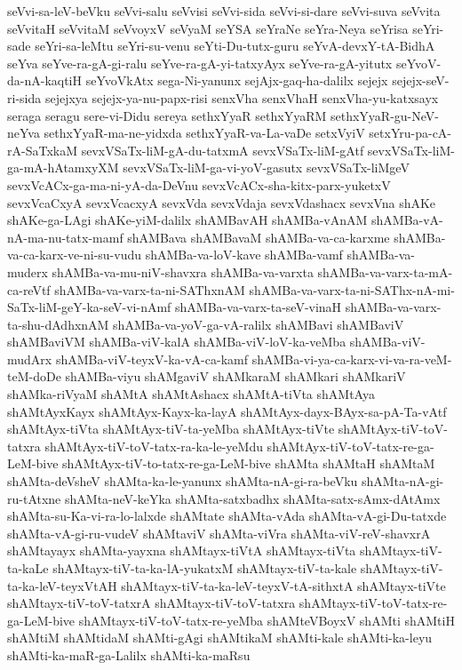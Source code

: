 {seVvi-sa-leV-beVku
seVvi-salu
seVvisi
seVvi-sida
seVvi-si-dare
seVvi-suva
seVvita
seVvitaH
seVvitaM
seVvoyxV
seVyaM
seYSA
seYraNe
seYra-Neya
seYrisa
seYri-sade
seYri-sa-leMtu
seYri-su-venu
seYti-Du-tutx-guru
seYvA-devxY-tA-BidhA
seYva
seYve-ra-gA-gi-ralu
seYve-ra-gA-yi-tatxyAyx
seYve-ra-gA-yitutx
seYvoV-da-nA-kaqtiH
seYvoVkAtx
sega-Ni-yanunx
sejAjx-gaq-ha-dalilx
sejejx
sejejx-seV-ri-sida
sejejxya
sejejx-ya-nu-papx-risi
senxVha
senxVhaH
senxVha-yu-katxsayx
seraga
seragu
sere-vi-Didu
sereya
sethxYyaR
sethxYyaRM
sethxYyaR-gu-NeV-neYva
sethxYyaR-ma-ne-yidxda
sethxYyaR-va-La-vaDe
setxVyiV
setxYru-pa-cA-rA-SaTxkaM
sevxVSaTx-liM-gA-du-tatxmA
sevxVSaTx-liM-gAtf
sevxVSaTx-liM-ga-mA-hAtamxyXM
sevxVSaTx-liM-ga-vi-yoV-gasutx
sevxVSaTx-liMgeV
sevxVcACx-ga-ma-ni-yA-da-DeVnu
sevxVcACx-sha-kitx-parx-yuketxV
sevxVcaCxyA
sevxVcacxyA
sevxVda
sevxVdaja
sevxVdashacx
sevxVna
shAKe
shAKe-ga-LAgi
shAKe-yiM-dalilx
shAMBavAH
shAMBa-vAnAM
shAMBa-vA-nA-ma-nu-tatx-mamf
shAMBava
shAMBavaM
shAMBa-va-ca-karxme
shAMBa-va-ca-karx-ve-ni-su-vudu
shAMBa-va-loV-kave
shAMBa-vamf
shAMBa-va-muderx
shAMBa-va-mu-niV-shavxra
shAMBa-va-varxta
shAMBa-va-varx-ta-mA-ca-reVtf
shAMBa-va-varx-ta-ni-SAThxnAM
shAMBa-va-varx-ta-ni-SAThx-nA-mi-SaTx-liM-geY-ka-seV-vi-nAmf
shAMBa-va-varx-ta-seV-vinaH
shAMBa-va-varx-ta-shu-dAdhxnAM
shAMBa-va-yoV-ga-vA-ralilx
shAMBavi
shAMBaviV
shAMBaviVM
shAMBa-viV-kalA
shAMBa-viV-loV-ka-veMba
shAMBa-viV-mudArx
shAMBa-viV-teyxV-ka-vA-ca-kamf
shAMBa-vi-ya-ca-karx-vi-va-ra-veM-teM-doDe
shAMBa-viyu
shAMgaviV
shAMkaraM
shAMkari
shAMkariV
shAMka-riVyaM
shAMtA
shAMtAshacx
shAMtA-tiVta
shAMtAya
shAMtAyxKayx
shAMtAyx-Kayx-ka-layA
shAMtAyx-dayx-BAyx-sa-pA-Ta-vAtf
shAMtAyx-tiVta
shAMtAyx-tiV-ta-yeMba
shAMtAyx-tiVte
shAMtAyx-tiV-toV-tatxra
shAMtAyx-tiV-toV-tatx-ra-ka-le-yeMdu
shAMtAyx-tiV-toV-tatx-re-ga-LeM-bive
shAMtAyx-tiV-to-tatx-re-ga-LeM-bive
shAMta
shAMtaH
shAMtaM
shAMta-deVsheV
shAMta-ka-le-yanunx
shAMta-nA-gi-ra-beVku
shAMta-nA-gi-ru-tAtxne
shAMta-neV-keYka
shAMta-satxbadhx
shAMta-satx-sAmx-dAtAmx
shAMta-su-Ka-vi-ra-lo-lalxde
shAMtate
shAMta-vAda
shAMta-vA-gi-Du-tatxde
shAMta-vA-gi-ru-vudeV
shAMtaviV
shAMta-viVra
shAMta-viV-reV-shavxrA
shAMtayayx
shAMta-yayxna
shAMtayx-tiVtA
shAMtayx-tiVta
shAMtayx-tiV-ta-kaLe
shAMtayx-tiV-ta-ka-lA-yukatxM
shAMtayx-tiV-ta-kale
shAMtayx-tiV-ta-ka-leV-teyxVtAH
shAMtayx-tiV-ta-ka-leV-teyxV-tA-sithxtA
shAMtayx-tiVte
shAMtayx-tiV-toV-tatxrA
shAMtayx-tiV-toV-tatxra
shAMtayx-tiV-toV-tatx-re-ga-LeM-bive
shAMtayx-tiV-toV-tatx-re-yeMba
shAMteVBoyxV
shAMti
shAMtiH
shAMtiM
shAMtidaM
shAMti-gAgi
shAMtikaM
shAMti-kale
shAMti-ka-leyu
shAMti-ka-maR-ga-Lalilx
shAMti-ka-maRsu
}
